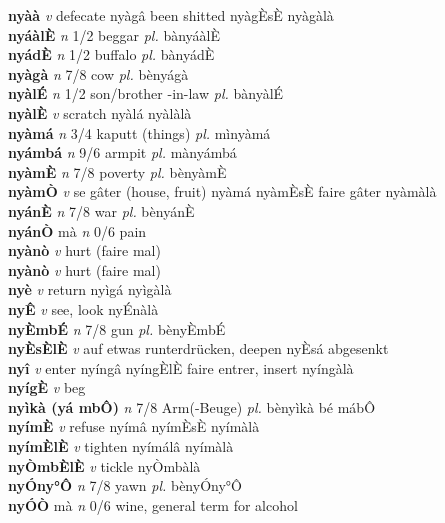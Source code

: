 \documentclass{article}
\begin{document}
{\bf nyàà}  {\it v} defecate   nyàgâ been shitted  nyàgÈsÈ nyàgàlà   \\ 
{\bf nyáàlÈ}  {\it n} 1/2 beggar {\it pl.} bànyáàlÈ         \\ 
{\bf nyádÈ}  {\it n} 1/2 buffalo {\it pl.} bànyádÈ         \\ 
{\bf nyàgà}  {\it n} 7/8 cow {\it pl.} bènyágà         \\ 
{\bf nyàlÉ}  {\it n} 1/2 son/brother -in-law {\it pl.} bànyàlÉ         \\ 
{\bf nyàlÈ}  {\it v} scratch   nyàlá   nyàlàlà   \\ 
{\bf nyàmá}  {\it n} 3/4 kaputt (things) {\it pl.} mìnyàmá         \\ 
{\bf nyámbá}  {\it n} 9/6 armpit {\it pl.} mànyámbá         \\ 
{\bf nyàmÈ}  {\it n} 7/8 poverty {\it pl.} bènyàmÈ         \\ 
{\bf nyàmÒ}  {\it v} se gâter (house, fruit)   nyàmá  nyàmÈsÈ faire gâter nyàmàlà   \\ 
{\bf nyánÈ}  {\it n} 7/8 war {\it pl.} bènyánÈ         \\ 
{\bf nyánÒ} mà {\it n} 0/6 pain         \\ 
{\bf nyànò}  {\it v} hurt (faire mal)         \\ 
{\bf nyànò}  {\it v} hurt (faire mal)         \\ 
{\bf nyè}  {\it v} return   nyìgá   nyìgàlà   \\ 
{\bf nyÊ}  {\it v} see, look      nyÉnàlà   \\ 
{\bf nyÈmbÉ}  {\it n} 7/8 gun {\it pl.} bènyÈmbÉ         \\ 
{\bf nyÈsÈlÈ}  {\it v} auf etwas runterdrücken, deepen   nyÈsá abgesenkt      \\ 
{\bf nyî}   {\it v} enter   nyíngâ nyíngÈlÈ faire entrer, insert  nyíngàlà   \\ 
{\bf nyígÈ}  {\it v} beg         \\ 
{\bf nyìkà (yá mbÔ)}  {\it n} 7/8 Arm(-Beuge) {\it pl.} bènyìkà bé mábÔ         \\ 
{\bf nyímÈ}  {\it v} refuse   nyímâ  nyímÈsÈ nyímàlà   \\ 
{\bf nyímÈlÈ}  {\it v} tighten   nyímálâ   nyímàlà   \\ 
{\bf nyÒmbÈlÈ}  {\it v} tickle      nyÒmbàlà   \\ 
{\bf nyÓny°Ô}  {\it n} 7/8 yawn {\it pl.} bènyÓny°Ô         \\ 
{\bf nyÓÒ} mà {\it n} 0/6 wine, general term for alcohol         \\ 
\end{document}
